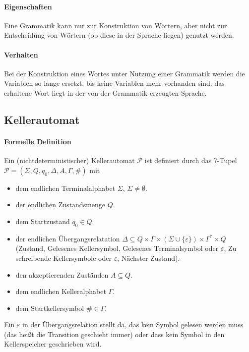 		\paragraph{Eigenschaften}
			Eine Grammatik kann nur zur Konstruktion von Wörtern, aber nicht zur Entscheidung von Wörtern (ob diese in der Sprache liegen) genutzt werden.

		\paragraph{Verhalten}
			Bei der Konstruktion eines Wortes unter Nutzung einer Grammatik werden die Variablen so lange ersetzt, bis keine Variablen mehr vorhanden sind. das erhaltene Wort liegt in der von der Grammatik erzeugten Sprache.


	\subsection{Kellerautomat}
		\paragraph{Formelle Definition}
			Ein (nichtdeterministischer) Kellerautomat $ \mathcal{P} $ ist definiert durch das 7-Tupel $ \mathcal{P} = (\Sigma, Q, q _ 0, \Delta, A, \Gamma, \#) $ mit
			\begin{itemize}
				\item dem endlichen Terminalalphabet $ \Sigma $, $ \Sigma \neq \emptyset $.
				\item der endlichen Zustandsmenge $ Q $.
				\item dem Startzustand $ q _ 0 \in Q $.
				\item der endlichen Übergangsrelatation $ \Delta \subseteq Q \times \Gamma \times (\Sigma \cup \{ \varepsilon \}) \times \Gamma ^ * \times Q $ (Zustand, Gelesenes Kellersymbol, Gelesenes Terminalsymbol oder $ \varepsilon $, Zu schreibende Kellersymbole oder $ \varepsilon $, Nächster Zustand).
				\item den akzeptierenden Zuständen $ A \subseteq Q $.
				\item dem endlichen Kelleralphabet $ \Gamma $.
				\item dem Startkellersymbol $ \# \in \Gamma $.
			\end{itemize}
			Ein $ \varepsilon $ in der Übergangsrelation stellt da, das kein Symbol gelesen werden muss (das heißt die Transition geschieht immer) oder dass kein Symbol in den Kellerspeicher geschrieben wird.

